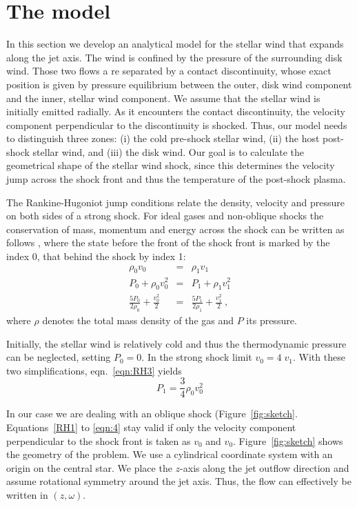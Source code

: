 \section{The model}

In this section we develop an analytical model for the stellar wind that expands along the jet axis. The wind is confined by the pressure of the surrounding disk wind. Those two flows a re separated by a contact discontinuity, whose exact position is given by pressure equilibrium between the outer, disk wind component and the inner, stellar wind component. We assume that the stellar wind is initially emitted radially. As it encounters the contact discontinuity, the velocity component perpendicular to the discontinuity is shocked. Thus, our model needs to distinguish three zones: (i) the cold pre-shock stellar wind, (ii) the host post-shock stellar wind, and (iii) the disk wind. Our goal is to calculate the geometrical shape of the stellar wind shock, since this determines the velocity jump across the shock front and thus the temperature of the post-shock plasma.

The Rankine-Hugoniot jump conditions relate the density, velocity and pressure on both sides of a strong shock. For ideal gases and non-oblique shocks the conservation of mass, momentum and energy across the shock can be written as follows \citep[][chap.~7, \S~15]{http://adsabs.harvard.edu/abs/1967pswh.book.....Z}, where the state before the front of the shock front is marked by the index 0, that behind the shock by index 1:
\begin{eqnarray}
\label{eqn:RH1}\rho_0 v_0 &=& \rho_1 v_1\\
\label{eqn:RH2}P_0+\rho_0 v_0^2 &=& P_1+\rho_1 v_1^2\\
\label{eqn:RH3}\frac{5 P_0}{2\rho_0}+\frac{v_0^2}{2}&=&\frac{5 P_1}{2\rho_1}+\frac{v_1^2}{2} \ ,
\end{eqnarray}
where $\rho$ denotes the total mass density of the gas and $P$ its pressure. 

Initially, the stellar wind is relatively cold and thus the thermodynamic pressure can be neglected, setting $P_0=0$. In the strong shock limit $v_0=4\;v_1$. With these two simplifications, eqn.~\ref{eqn:RH3} yields
\begin{equation} \label{eqn:4}
P_1 = \frac{3}{4} \rho_0 v_0^2
\end{equation}

In our case we are dealing with an oblique shock (Figure~\ref{fig:sketch}. Equations~\ref{RH1} to \ref{eqn:4} stay valid if only the velocity component perpendicular to the shock front is taken as $v_0$ and $v_0$. 
Figure~\ref{fig:sketch} shows the geometry of the problem. We use a cylindrical coordinate system with an origin on the central star. We place the $z$-axis along the jet outflow direction and assume rotational symmetry around the jet axis. Thus, the flow can effectively be written in $(z,\omega)$. 

